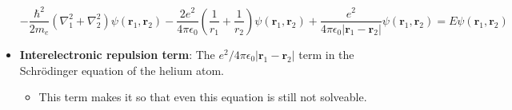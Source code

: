 \documentclass[../notes.tex]{subfiles}
\begin{document}
\begin{itemize}
\begin{equation*}
        -\frac{\hbar^2}{2m_e}(\nabla_1^2+\nabla_2^2)\psi(\mathbf{r}_1,\mathbf{r}_2)-\frac{2e^2}{4\pi\epsilon_0}\left( \frac{1}{r_1}+\frac{1}{r_2} \right)\psi(\mathbf{r}_1,\mathbf{r}_2)+\frac{e^2}{4\pi\epsilon_0|\mathbf{r}_1-\mathbf{r}_2|}\psi(\mathbf{r}_1,\mathbf{r}_2) = E\psi(\mathbf{r}_1,\mathbf{r}_2)
    \end{equation*}
    \item \textbf{Interelectronic repulsion term}: The $e^2/4\pi\epsilon_0|\mathbf{r}_1-\mathbf{r}_2|$ term in the Schr\"{o}dinger equation of the helium atom.
    \begin{itemize}
        \item This term makes it so that even this equation is still not solveable.
    \end{itemize}
\end{itemize}
\end{document}
